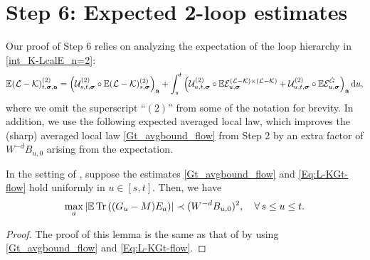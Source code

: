 \section{Step 6: Expected 2-loop estimates}\label{Sec:Step6}

Our proof of Step 6 relies on analyzing the expectation of the loop hierarchy in \eqref{int_K-LcalE_n=2}: 
\begin{align} \label{Eexpint_K-L}
\E(\mathcal{L} - \mathcal{K})^{(2)}_{t, \bsig, \ba}=
    \left(\mathcal{U}^{(2)}_{s, t, \bsig} \circ \E(\mathcal{L} - \mathcal{K})^{(2)}_{s, \bsig}\right)_{\ba}+ \int_{s}^t \left(\mathcal{U}^{(2)}_{u, t, \bsig} \circ \E\mathcal{E}^{(\mathcal{L} - \mathcal{K}) \times (\mathcal{L} - \mathcal{K})}_{u, \bsig} + \mathcal{U}^{(2)}_{u, t, \bsig} \circ \E\mathcal{E}^{\Gc}_{u, \bsig}\right)_{\ba} \dd u ,  %
\end{align}
where we omit the superscript ``$(2)$'' from some of the notation for brevity. 
In addition, we use the following expected averaged local law, which improves the (sharp) averaged local law \eqref{Gt_avgbound_flow} from Step 2 by an extra factor of $W^{-d}B_{u,0}$ arising from the expectation.
 

\begin{lemma}\label{lem:improve_exp_aver}
In the setting of , suppose the estimates \eqref{Gt_avgbound_flow} and \eqref{Eq:L-KGt-flow} hold uniformly in $u\in[s,t]$. Then, we have 
\begin{align}\label{res_ELK_n=1} 
  \max_{a}  \left|\mathbb{E}\operatorname{Tr}\left({ (G_u-M) E_{a}}\right)\right|
  \prec (W^{-d}B_{u,0})^{2},\quad \forall\, s\le u \le t.
  \end{align} 
\end{lemma}
\begin{proof}
    The proof of this lemma is the same as that of \cite[Lemma 5.15]{YY_25} by using \eqref{Gt_avgbound_flow} and \eqref{Eq:L-KGt-flow}. %
\end{proof}





